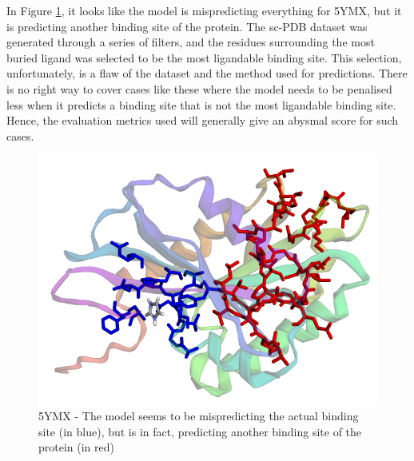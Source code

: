 \documentclass[journal=jcisd8,manuscript=article]{achemso}
\begin{document}
In Figure \ref{fig:5ymx}, it looks like the model is mispredicting everything for 5YMX\cite{galicia2019mgla}, but it is predicting another binding site of the protein. The sc-PDB\cite{desaphy2015sc} dataset was generated through a series of filters, and the residues surrounding the most buried ligand was selected to be the most ligandable binding site. This selection, unfortunately, is a flaw of the dataset and the method used for predictions. There is no right way to cover cases like these where the model needs to be penalised less when it predicts a binding site that is not the most ligandable binding site. Hence, the evaluation metrics used will generally give an abysmal score for such cases.
\begin{figure}
    \centering
    \noindent\includegraphics[scale=0.4]{5ymx.png}
    \caption{\centering 5YMX - The model seems to be mispredicting the actual binding site (in blue), but is in fact, predicting another binding site of the protein (in red)}
    \label{fig:5ymx}
\end{figure}
\end{document}
